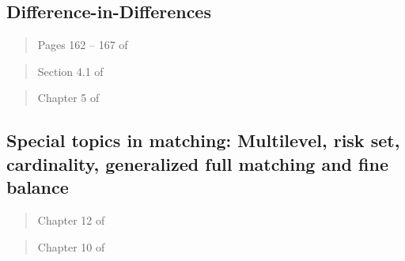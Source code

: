 \documentclass[12pt]{article}
\begin{document}
\subsection{Difference-in-Differences}

\begin{verse} Pages 162 -- 167 of  \end{verse}

\begin{verse} Section 4.1 of  \end{verse}

\begin{verse} Chapter 5 of  \end{verse}

\begin{verse}  \end{verse}

\begin{verse}  \end{verse}

\begin{verse}  \end{verse}

\begin{verse}  \end{verse}

\subsection{Special topics in matching: Multilevel, risk set, cardinality, generalized full matching and fine balance}

\begin{verse}  \end{verse}

\begin{verse}  \end{verse}

\begin{verse} Chapter 12 of  \end{verse}

\begin{verse}  \end{verse}

\begin{verse} Chapter 10 of  \end{verse}
\end{document}
